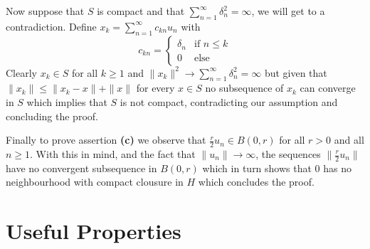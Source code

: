\documentclass{article}
\begin{document}
\begin{exercise}
\bigbreak

Now suppose that $S$ is compact and that $\sum_{n=1}^{\infty} \delta_n^2 = \infty $, we will get to a contradiction. Define $x_k = \sum_{n=1}^{\infty} c_{kn}u_n $ with
\[
    c_{kn} = 
    \begin{cases}
        \delta_n & \text{if } n \le k \\
        0 & \text{else}
    \end{cases}
\]
Clearly $x_k \in S$ for all $k \ge 1$  and $\|x_k\|^2 \rightarrow \sum_{n=1}^{\infty} \delta_n^2 = \infty$ but given that $\|x_k\| \le \|x_k-x\| + \|x\|$ for every $x \in S$ no subsequence of $x_k$ can converge in $S$ which implies that $S$ is not compact, contradicting our assumption and concluding the proof.  

\bigbreak

Finally to prove assertion \textbf{(c)} we observe that $\frac{r}{2}u_n \in B \left( 0,r \right)$ for all $r > 0$ and all $n \ge 1$. With this in mind, and the fact that $\|u_n\| \rightarrow \infty $, the sequences $\|\frac{r}{2}u_n\| $ have no convergent subsequence in $B \left( 0,r \right) $ which in turn shows that $0$ has no neighbourhood with compact clousure in $H$ which concludes the proof. 
\end{exercise}

\section*{Useful Properties}
\end{document}
